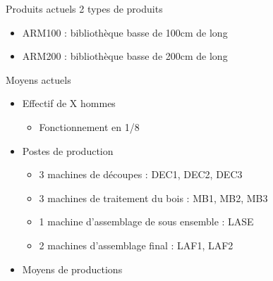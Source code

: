 
\begin{frame}{Produits actuels}
\vfill
2 types de produits
\begin{itemize}
\item ARM100 : bibliothèque basse de 100cm de long
\item ARM200 : bibliothèque basse de 200cm de long
\end{itemize}
\end{frame}

\begin{frame}{Moyens actuels}
\begin{itemize}
\item Effectif de X hommes
\begin{itemize}
\item Fonctionnement en 1/8
\end{itemize}
\item Postes de production
\begin{itemize}
\item 3 machines de découpes : DEC1, DEC2, DEC3
\item 3 machines de traitement du bois : MB1, MB2, MB3
\item 1 machine d’assemblage de sous ensemble : LASE
\item 2 machines d’assemblage final : LAF1, LAF2
\end{itemize}
\item Moyens de productions
\end{itemize}
\end{frame}

